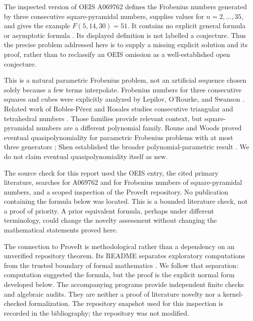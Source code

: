 \documentclass[11pt,a4paper]{article}
\numberwithin{equation}{section}
\theoremstyle{definition}
\begin{document}
The inspected version of OEIS A069762 defines the Frobenius numbers generated
by three consecutive square-pyramidal numbers, supplies values for
$n=2,\ldots,35$, and gives the example
$F(5,14,30)=51$. It contains no explicit general formula or asymptotic
formula \cite{oeis}. Its displayed definition is not labelled a conjecture.
Thus the precise problem addressed here is to supply a missing explicit
solution and its proof, rather than to reclassify an OEIS omission as a
well-established open conjecture.

This is a natural parametric Frobenius problem, not an artificial sequence
chosen solely because a few terms interpolate. Frobenius numbers for three
consecutive squares and cubes were explicitly analyzed by Lepilov,
O'Rourke, and Swanson \cite{los}. Related work of Robles-P\'erez and Rosales
studies consecutive triangular and tetrahedral numbers \cite{rr}. Those
families provide relevant context, but square-pyramidal numbers are a
different polynomial family. Roune and Woods proved eventual
quasipolynomiality for parametric Frobenius problems with at most three
generators \cite{rw}; Shen established the broader polynomial-parametric
result \cite{shen}. We do not claim eventual quasipolynomiality itself as new.

The source check for this report used the OEIS entry, the cited primary
literature, searches for A069762 and for Frobenius numbers of square-pyramidal
numbers, and a scoped inspection of the ProveIt repository. No publication
containing the formula below was located. This is a bounded literature
check, not a proof of priority. A prior equivalent formula, perhaps under
different terminology, could change the novelty assessment without changing
the mathematical statements proved here.

The connection to ProveIt is methodological rather than a dependency on an
unverified repository theorem. Its README separates exploratory computations
from the trusted boundary of formal mathematics \cite{proveit}. We follow
that separation: computation suggested the formula, but the proof is the
explicit normal form developed below. The accompanying programs provide
independent finite checks and algebraic audits. They are neither a proof of
literature novelty nor a kernel-checked formalization. The repository snapshot
used for this inspection is recorded in the bibliography; the repository
was not modified.
\end{document}
